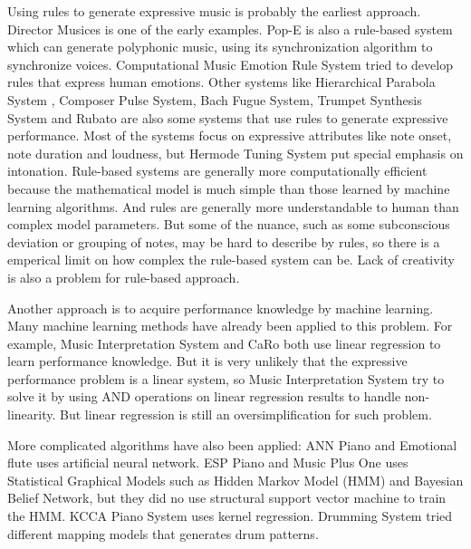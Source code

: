 Using rules to generate expressive music is probably the earliest approach. Director Musices \cite{17} is one of the early examples.   Pop-E \cite{28} is also a rule-based system which can generate polyphonic music, using its synchronization algorithm to synchronize voices. Computational Music Emotion Rule System \cite{31} tried to develop rules that express human emotions.  Other systems like Hierarchical Parabola System \cite{17}\cite{18}\cite{19}\cite{20}, Composer Pulse System\cite{21,22}, Bach Fugue System\cite{23}, Trumpet Synthesis System \cite{24, 25} and Rubato \cite{26, 27} are also some systems that use rules to generate expressive performance. Most of the systems focus on expressive attributes like note onset, note duration and loudness, but Hermode Tuning System \cite{29} put special emphasis on intonation. Rule-based systems are generally more computationally efficient because the mathematical model is much simple than those learned by machine learning algorithms. And rules are generally more understandable to human than complex model parameters. But some of the nuance, such as some subconscious deviation or grouping of notes, may be hard to describe by rules, so there is a emperical limit on how complex the rule-based system can be. Lack of creativity is also a problem for rule-based approach.

Another approach is to acquire performance knowledge by machine learning. Many machine learning methods have already been applied to this problem. For example, Music Interpretation System \cite{32,33,34} and CaRo \cite{35,36,37} both use linear regression to learn performance knowledge. But it is very unlikely that the expressive performance problem is a linear system, so Music Interpretation System try to solve it by using AND operations on linear regression results to handle non-linearity. But linear regression is still an oversimplification for such problem.

More complicated algorithms have also been applied: ANN Piano \cite{38} and Emotional flute \cite{39} uses artificial neural network. ESP Piano \cite{55} and Music Plus One \cite{52,53,54} uses Statistical Graphical Models such as Hidden Markov Model (HMM) and Bayesian Belief Network, but they did no use structural support vector machine to train the HMM.%
KCCA Piano System \cite{57} uses kernel regression. Drumming System \cite{82} tried different mapping models that generates drum patterns.

